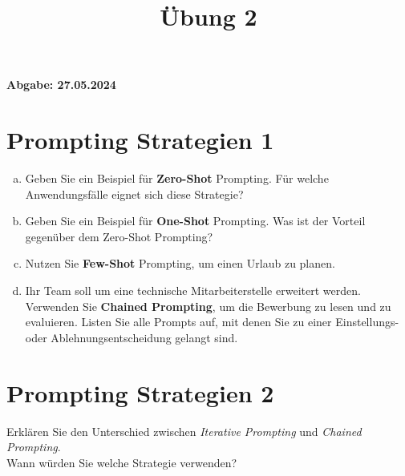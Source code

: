 \documentclass[12pt,ngerman]{AssignmentClass}
\title{Übung 2} %
\begin{document}
	\maketitle

    \noindent %
    \begin{tcolorbox}[colback=gray!20, %
                      colframe=gray!20, %
                      boxrule=0pt, %
                      sharp corners, %
                      valign=center, %
                      halign=center, %
                      height=2cm] %
    \LARGE \bfseries Abgabe: 27.05.2024 %
    \end{tcolorbox}


    \section{Prompting Strategien 1}
        \begin{enumerate}[a)]
            \item Geben Sie ein Beispiel für \textbf{Zero-Shot} Prompting. Für welche Anwendungsfälle eignet sich diese Strategie?
            \item Geben Sie ein Beispiel für \textbf{One-Shot} Prompting. Was ist der Vorteil gegenüber dem Zero-Shot Prompting?
            \item Nutzen Sie \textbf{Few-Shot} Prompting, um einen Urlaub zu planen.
            \item Ihr Team soll um eine technische Mitarbeiterstelle erweitert werden. Verwenden Sie \textbf{Chained Prompting}, um die Bewerbung zu lesen und zu evaluieren. Listen Sie alle Prompts auf, mit denen Sie zu einer Einstellungs- oder Ablehnungsentscheidung gelangt sind.
        \end{enumerate}


    \section{Prompting Strategien 2}
        Erklären Sie den Unterschied zwischen \textit{Iterative Prompting} und \textit{Chained Prompting}.\\
        Wann würden Sie welche Strategie verwenden?
\end{document}
